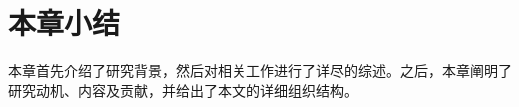 
\section{本章小结}
本章首先介绍了研究背景，然后对相关工作进行了详尽的综述。之后，本章阐明了研究动机、内容及贡献，并给出了本文的详细组织结构。

\afterpage{\null\newpage}\clearpage